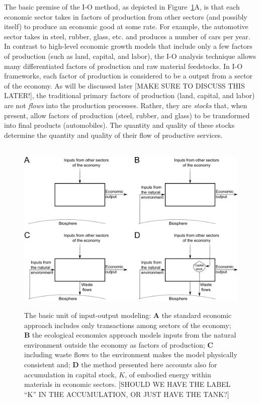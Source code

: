 The basic premise of the I-O method, 
as depicted in Figure~\ref{fig:basic_unit}A, 
is that each economic sector takes in factors of production 
from other sectors (and possibly itself) 
to produce an economic good at some rate. 
For example, the automotive sector takes in steel, rubber, glass, etc. 
and produces a number of cars per year. 
In contrast to high-level economic growth models 
that include only a few factors of production (such as land, capital, and labor), 
the I-O analysis technique allows many differentiated factors of production 
and raw material feedstocks.\cite{Costanza:1980ww} 
In I-O frameworks, each factor of production 
is considered to be a output from a sector of the economy. 
As will be discussed later [MAKE SURE TO DISCUSS THIS LATER!], 
the traditional primary factors of production (land, capital, and labor) 
are not \emph{flows} into the production processes. 
Rather, they are \emph{stocks} that, when present, 
allow factors of production (steel, rubber, and glass) 
to be transformed into final products (automobiles). 
The quantity and quality of these stocks 
determine the quantity and quality of their flow of productive services.

\begin{figure}[!ht]
\centering\
\includegraphics[width=\linewidth]{Part_0/Chapter_Introduction/images/Basic_unit_square.pdf}
\caption[The basic unit of input-output modeling]{The basic unit 
of input-output modeling: 
\textbf{A} the standard economic approach includes only transactions 
among sectors of the economy; 
\textbf{B} the ecological economics approach models inputs 
from the natural environment outside the economy as factors of production; 
\textbf{C} including waste flows to the environment makes the model physically consistent and;
\textbf{D} the method presented here accounts also for accumulation
in capital stock, $K$, of embodied energy within materials in economic sectors. 
[SHOULD WE HAVE THE LABEL ``K'' IN THE ACCUMULATION, OR JUST HAVE THE TANK?]}
\label{fig:basic_unit}
\end{figure}

